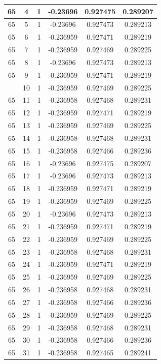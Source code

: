 \documentclass[12pt,a4paper]{article}
\numberwithin{equation}{section}
\numberwithin{figure}{section}
\numberwithin{table}{section}
\begin{document}
\begin{longtable}{|c|c|c|c|c|c|}
65 & 4 & 1 & -0.23696 & 0.927475 & 0.289207 \\ \hline
65 & 5 & 1 & -0.23696 & 0.927473 & 0.289213 \\ \hline
65 & 6 & 1 & -0.236959 & 0.927471 & 0.289219 \\ \hline
65 & 7 & 1 & -0.236959 & 0.927469 & 0.289225 \\ \hline
65 & 8 & 1 & -0.23696 & 0.927473 & 0.289213 \\ \hline
65 & 9 & 1 & -0.236959 & 0.927471 & 0.289219 \\ \hline
\pagebreak
65 & 10 & 1 & -0.236959 & 0.927469 & 0.289225 \\ \hline
65 & 11 & 1 & -0.236958 & 0.927468 & 0.289231 \\ \hline
65 & 12 & 1 & -0.236959 & 0.927471 & 0.289219 \\ \hline
65 & 13 & 1 & -0.236959 & 0.927469 & 0.289225 \\ \hline
65 & 14 & 1 & -0.236958 & 0.927468 & 0.289231 \\ \hline
65 & 15 & 1 & -0.236958 & 0.927466 & 0.289236 \\ \hline
65 & 16 & 1 & -0.23696 & 0.927475 & 0.289207 \\ \hline
65 & 17 & 1 & -0.23696 & 0.927473 & 0.289213 \\ \hline
65 & 18 & 1 & -0.236959 & 0.927471 & 0.289219 \\ \hline
65 & 19 & 1 & -0.236959 & 0.927469 & 0.289225 \\ \hline
65 & 20 & 1 & -0.23696 & 0.927473 & 0.289213 \\ \hline
65 & 21 & 1 & -0.236959 & 0.927471 & 0.289219 \\ \hline
65 & 22 & 1 & -0.236959 & 0.927469 & 0.289225 \\ \hline
65 & 23 & 1 & -0.236958 & 0.927468 & 0.289231 \\ \hline
65 & 24 & 1 & -0.236959 & 0.927471 & 0.289219 \\ \hline
65 & 25 & 1 & -0.236959 & 0.927469 & 0.289225 \\ \hline
65 & 26 & 1 & -0.236958 & 0.927468 & 0.289231 \\ \hline
65 & 27 & 1 & -0.236958 & 0.927466 & 0.289236 \\ \hline
65 & 28 & 1 & -0.236959 & 0.927469 & 0.289225 \\ \hline
65 & 29 & 1 & -0.236958 & 0.927468 & 0.289231 \\ \hline
65 & 30 & 1 & -0.236958 & 0.927466 & 0.289236 \\ \hline
65 & 31 & 1 & -0.236958 & 0.927465 & 0.289241 \\ \hline

\end{longtable}
\end{document}
